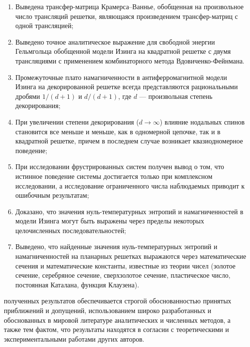 {}
\begin{enumerate}[beginpenalty=10000] %
  \item Выведена трансфер-матрица Крамерса–Ваннье, обобщенная на произвольное число трансляций решетки, являющаяся произведением трансфер-матриц с одной трансляцией;
  \item Выведено точное аналитическое выражение для свободной энергии Гельмгольца обобщенной модели Изинга на квадратной решетке с двумя трансляциями с применением комбинаторного метода Вдовиченко-Фейнмана.
  \item Промежуточные плато намагниченности в антиферромагнитной модели Изинга на декорированной решетке всегда представляются рациональными дробями $1/(d + 1)$ и $d/(d + 1)$, где $d$ --- произвольная степень декорирования;
  \item При увеличении степени декорирования ($d \rightarrow \infty$) влияние нодальных спинов становится все меньше и меньше, как в одномерной цепочке, так и в квадратной решетке, причем в последнем случае возникает квазиодномерное поведение;
  \item При исследовании фрустрированных систем получен вывод о том, что истинное поведение системы достигается только при комплексном исследовании, а исследование ограниченного числа наблюдаемых приводит к ошибочным результатам;
  \item Доказано, что значения нуль-температурных энтропий и намагниченностей в модели Изинга могут быть выражены через пределы некоторых целочисленных последовательностей;
  \item Выведено, что найденные значения нуль-температурных энтропий и намагниченностей на планарных решетках выражаются через математические сечения и математические константы, известные из теории чисел (золотое сечение, серебряное сечение, сверхзолотое сечение, пластическое число, постоянная Каталана, функция Клаузена). 
\end{enumerate}

{\reliability} полученных результатов обеспечивается строгой обоснованностью принятых приближений и допущений, использованием широко разработанных и обоснованных в мировой литературе аналитических и численных методов, а также тем фактом, что результаты находятся в согласии с теоретическими и экспериментальными работами других авторов.

